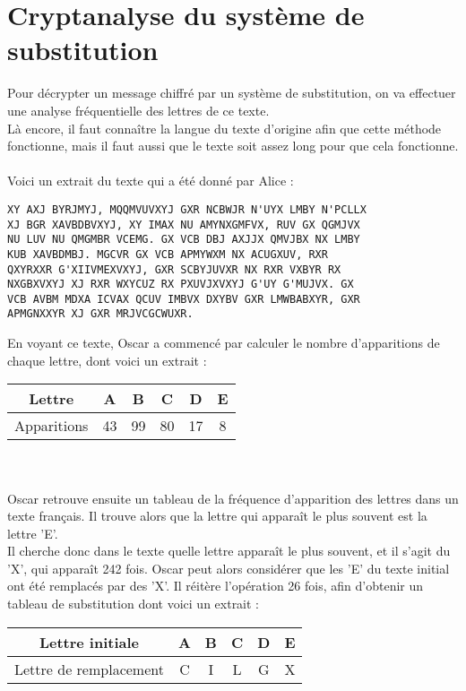 	\section{Cryptanalyse du système de substitution}
		Pour décrypter un message chiffré par un système de substitution, on va effectuer une analyse fréquentielle des lettres de ce texte.\\
		Là encore, il faut connaître la langue du texte d'origine afin que cette méthode fonctionne, mais il faut aussi que le texte soit assez long pour que cela fonctionne.\\
		\\
		Voici un extrait du texte qui a été donné par Alice :
		\begin{lstlisting}
XY AXJ BYRJMYJ, MQQMVUVXYJ GXR NCBWJR N'UYX LMBY N'PCLLX
XJ BGR XAVBDBVXYJ, XY IMAX NU AMYNXGMFVX, RUV GX QGMJVX
NU LUV NU QMGMBR VCEMG. GX VCB DBJ AXJJX QMVJBX NX LMBY
KUB XAVBDMBJ. MGCVR GX VCB APMYWXM NX ACUGXUV, RXR
QXYRXXR G'XIIVMEXVXYJ, GXR SCBYJUVXR NX RXR VXBYR RX
NXGBXVXYJ XJ RXR WXYCUZ RX PXUVJXVXYJ G'UY G'MUJVX. GX
VCB AVBM MDXA ICVAX QCUV IMBVX DXYBV GXR LMWBABXYR, GXR
APMGNXXYR XJ GXR MRJVCGCWUXR.
		\end{lstlisting}
		En voyant ce texte, Oscar a commencé par calculer le nombre d'apparitions de chaque lettre, dont voici un extrait :\\
		\begin{tabular}{ | c | c | c | c | c | c | }
			\hline
			Lettre & A & B & C & D & E\\ \hline
			Apparitions & 43 & 99 & 80 & 17 & 8\\
			\hline
		\end{tabular}\\
		\\
		Oscar retrouve ensuite un tableau de la fréquence d'apparition des lettres dans un texte français. Il trouve alors que la lettre qui apparaît le plus souvent est la lettre 'E'.\\
		Il cherche donc dans le texte quelle lettre apparaît le plus souvent, et il s'agit du 'X', qui apparaît 242 fois. Oscar peut alors considérer que les 'E' du texte initial ont été remplacés par des 'X'. Il réitère l'opération 26 fois, afin d'obtenir un tableau de substitution dont voici un extrait :\\
		\begin{tabular}{ | c | c | c | c | c | c | }
			\hline
			Lettre initiale & A & B & C & D & E \\ \hline
			Lettre de remplacement & C & I & L & G & X\\
			\hline
		\end{tabular}\\
